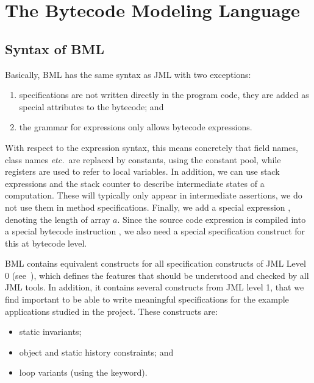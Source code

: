 \section{The Bytecode Modeling Language}
\label{SecBML}


\subsection{Syntax of BML}

Basically, BML has the same syntax as JML with two exceptions:
\begin{enumerate}
\item specifications are not written directly in the program code,
they are added as special attributes to the bytecode; and
\item the grammar for expressions only allows bytecode expressions.
\end{enumerate}

With respect to the expression syntax, this means concretely that
field names, class names \emph{etc.}\ are replaced by constants, using
the constant pool, while registers are used to refer to local
variables. In addition, we can use stack expressions and the stack
counter to describe intermediate states of a computation. These will
typically only appear in intermediate assertions, we do not use them
in method specifications. Finally, we add a special expression
, denoting the length of array \(a\). Since the 
source code expression  is compiled into a
special bytecode instruction , we also need a
special specification construct for this at bytecode level.

BML contains equivalent constructs for all specification constructs of
JML Level 0 (see~\cite[\S2.9]{JMLReferenceManual05}), which defines
the features that should be understood and checked by all JML
tools. In addition, it contains several constructs from JML level 1,
that we find important to be able to write meaningful specifications
for the example applications studied in the \mobius project. These
constructs are:
\begin{itemize}
\item static invariants;
\item object and static history constraints; and 
\item loop variants (using the  keyword).
\end{itemize}

